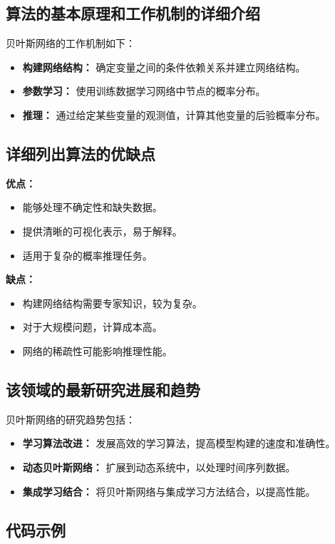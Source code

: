 \subsection*{算法的基本原理和工作机制的详细介绍}
贝叶斯网络的工作机制如下：
\begin{itemize}
    \item \textbf{构建网络结构：} 确定变量之间的条件依赖关系并建立网络结构。
    \item \textbf{参数学习：} 使用训练数据学习网络中节点的概率分布。
    \item \textbf{推理：} 通过给定某些变量的观测值，计算其他变量的后验概率分布。
\end{itemize}

\subsection*{详细列出算法的优缺点}
\textbf{优点：}
\begin{itemize}
    \item 能够处理不确定性和缺失数据。
    \item 提供清晰的可视化表示，易于解释。
    \item 适用于复杂的概率推理任务。
\end{itemize}

\textbf{缺点：}
\begin{itemize}
    \item 构建网络结构需要专家知识，较为复杂。
    \item 对于大规模问题，计算成本高。
    \item 网络的稀疏性可能影响推理性能。
\end{itemize}

\subsection*{该领域的最新研究进展和趋势}
贝叶斯网络的研究趋势包括：
\begin{itemize}
    \item \textbf{学习算法改进：} 发展高效的学习算法，提高模型构建的速度和准确性。
    \item \textbf{动态贝叶斯网络：} 扩展到动态系统中，以处理时间序列数据。
    \item \textbf{集成学习结合：} 将贝叶斯网络与集成学习方法结合，以提高性能。
\end{itemize}
\subsection*{代码示例}
\begin{lstlisting}

\end{lstlisting}


